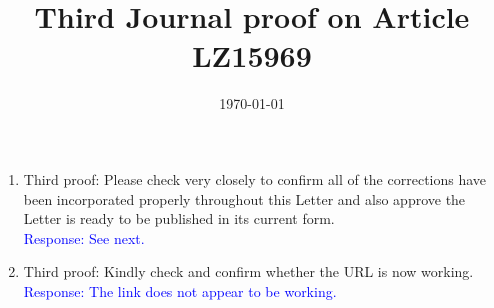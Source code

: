 \documentclass[a4paper,11pt,twoside]{article}
\title{Third Journal proof on Article LZ15969}
\date{\today}
\begin{document}
\maketitle


\begin{enumerate}

\item Third proof: Please check very closely to confirm all of the corrections have been incorporated properly throughout this
Letter and also approve the Letter is ready to be published in its current form.\\
   \textcolor{blue}{Response: See next.} 

\item Third proof: Kindly check and confirm whether the URL is now working. \\
   \textcolor{blue}{Response: The link does not appear to be working.} 

\end{enumerate}
\end{document}
